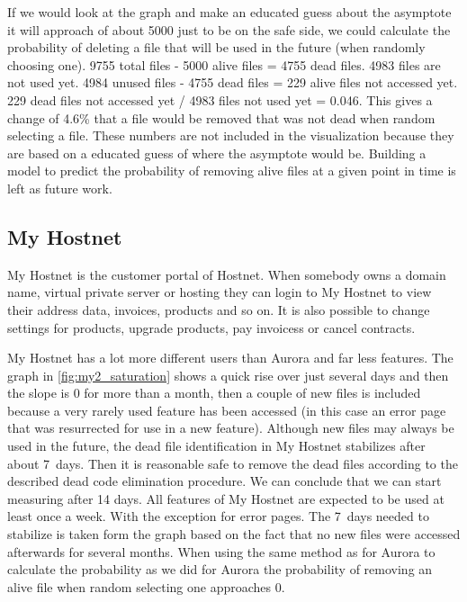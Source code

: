 If we would look at the graph and make an educated guess about the asymptote it will approach of about 5000 just to be on the safe side, we could calculate the probability of deleting a file that will be used in the future (when randomly choosing one). 9755 total files - 5000 alive files = 4755 dead files. 4983 files are not used yet. 4984 unused files - 4755 dead files = 229 alive files not accessed yet. 229 dead files not accessed yet / 4983 files not used yet = 0.046. This gives a change of 4.6\% that a file would be removed that was not dead when random selecting a file. These numbers are not included in the visualization because they are based on a educated guess of where the asymptote would be. Building a model to predict the probability of removing alive files at a given point in time is left as future work.

\subsection*{My Hostnet}

My Hostnet is the customer portal of Hostnet. When somebody owns a domain name, virtual private server or hosting they can login to My Hostnet to view their address data, invoices, products and so on. It is also possible to change settings for products, upgrade products, pay invoicess or cancel contracts.
\\


My Hostnet has a lot more different users than Aurora and far less features. The graph in \autoref{fig:my2_saturation} shows a quick rise over just several days and then the slope is 0 for more than a month, then a couple of new files is included because a very rarely used feature has been accessed (in this case an error page that was resurrected for use in a new feature). Although new files may always be used in the future, the dead file identification in My Hostnet stabilizes after about 7~days. Then it is reasonable safe to remove the dead files according to the described dead code elimination procedure. We can conclude that we can start measuring after 14 days. All features of My Hostnet are expected to be used at least once a week. With the exception for error pages. The 7~days needed to stabilize is taken form the graph based on the fact that no new files were accessed afterwards for several months. When using the same method as for Aurora to calculate the probability as we did for Aurora the probability of removing an alive file when random selecting one approaches 0.



